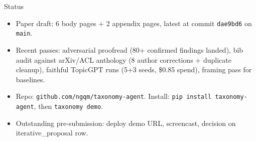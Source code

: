 \documentclass[10pt,aspectratio=169]{beamer}
\begin{document}
\begin{frame}{Status}
  \footnotesize
  \begin{itemize}
    \item Paper draft: 6 body pages + 2 appendix pages, latest at commit
          \texttt{dae9bd6} on \texttt{main}.
    \item Recent passes: adversarial proofread (80+ confirmed findings
          landed), bib audit against arXiv/ACL anthology
          (8 author corrections + duplicate cleanup), faithful
          TopicGPT runs (5+3 seeds, \$0.85 spend), framing pass for
          baselines.
    \item Repo: \texttt{github.com/ngqm/taxonomy-agent}. Install:
          \texttt{pip install taxonomy-agent}, then
          \texttt{taxonomy demo}.
    \item Outstanding pre-submission: deploy demo URL, screencast,
          decision on iterative\_proposal row.
  \end{itemize}
\end{frame}
\end{document}
